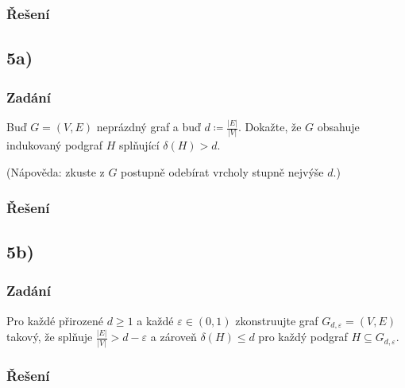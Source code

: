 \documentclass[../main.tex]{subfiles}
\begin{document}
\subsubsection*{Řešení}


\subsection{5a)}
\subsubsection*{Zadání}
Buď $G=(V,E)$ neprázdný graf a buď $d \coloneq \frac{|E|}{|V|}$. Dokažte, že $G$ obsahuje indukovaný podgraf $H$ splňující $\delta(H) > d$.

(Nápověda: zkuste z $G$ postupně odebírat vrcholy stupně nejvýše $d$.)

\subsubsection*{Řešení}


\subsection{5b)}
\subsubsection*{Zadání}
Pro každé přirozené $d\geq 1$ a každé $\varepsilon\in(0,1)$ zkonstruujte graf $G_{d,\varepsilon}= (V,E)$
takový, že splňuje $\frac{|E|}{|V|} > d - \varepsilon$ a zároveň $\delta(H)\leq d$ pro každý podgraf $H \subseteq G_{d,\varepsilon}$.


\subsubsection*{Řešení}
\end{document}
